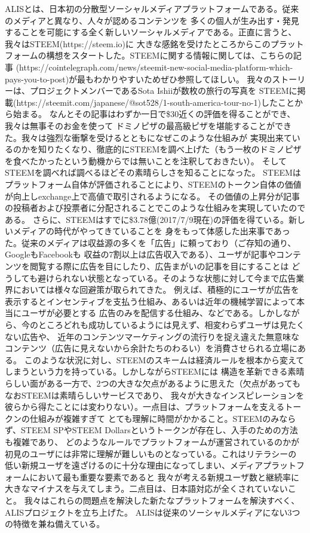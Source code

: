 \documentclass{jsarticle}
\begin{document}
ALISとは、日本初の分散型ソーシャルメディアプラットフォームである。従来のメディアと異なり、人々が認めるコンテンツを
多くの個人が生み出す・発見することを可能にする全く新しいソーシャルメディアである。正直に言うと、我々はSTEEM(https://steem.io)に
大きな感銘を受けたところからこのプラットフォームの構想をスタートした。STEEMに関する情報に関しては、こちらの記事
(https://cointelegraph.com/news/steemit-new-social-media-platform-which-pays-you-to-post)が最もわかりやすいためぜひ参照してほしい。
我々のストーリーは、プロジェクトメンバーであるSota Ishiiが数枚の旅行の写真を
STEEMに掲載(https://steemit.com/japanese/@sot528/1-south-america-tour-no-1)したことから始まる。
なんとその記事はわずか一日で\$30近くの評価を得ることができ、我々は無事そのお金を使って
ドミノピザの最高級ピザを堪能することができた。我々は強烈な衝撃を受けるとともになぜこのような仕組みが
実現出来ているのかを知りたくなり、徹底的にSTEEMを調べ上げた（もう一枚のドミノピザを食べたかったという動機からでは無いことを注釈しておきたい）。
そしてSTEEMを調べれば調べるほどその素晴らしさを知ることになった。
STEEMはプラットフォーム自体が評価されることにより、STEEMのトークン自体の価値が向上しexchange上で高値で取引されるようになる。
その価値の上昇分が記事の投稿者および投票者に分配されることでこのような仕組みを実現していたのである。
さらに、STEEMはすでに\$3.78億(2017/7/9現在)の評価を得ている。新しいメディアの時代がやってきていることを
身をもって体感した出来事であった。従来のメディアは収益源の多くを「広告」に頼っており（ご存知の通り、GoogleもFacebookも
収益の7割以上は広告収入である）、ユーザが記事やコンテンツを閲覧する際に広告を目にしたり、広告まがいの記事を目にすることは
どうしても避けられない状態となっている。そのような状態に対して今まで広告業界においては様々な回避策が取られてきた。
例えば、積極的にユーザが広告を表示するとインセンティブを支払う仕組み、あるいは近年の機械学習によって本当にユーザが必要とする
広告のみを配信する仕組み、などである。しかしながら、今のところどれも成功しているようには見えず、相変わらずユーザは見たくない広告や、
近年のコンテンツマーケティングの流行りを捉え違えた無意味なコンテンツ（広告に見えないから余計たちのわるい）を消費させられる立場にある。
このような状況に対し、STEEMのスキームは経済ルールを根本から変えてしまうという力を持っている。しかしながらSTEEMには
構造を革新できる素晴らしい面がある一方で、2つの大きな欠点があるように思えた（欠点があってもなおSTEEMは素晴らしいサービスであり、
我々が大きなインスピレーションを彼らから得たことには変わりない）。一点目は、プラットフォームを支えるトークンの仕組みが複雑すぎて
とても理解に時間がかかること。STEEMのみならず、STEEM SPやSTEEM Dollarsというトークンが存在し、入手のための方法も複雑であり、
どのようなルールでプラットフォームが運営されているのかが初見のユーザには非常に理解が難しいものとなっている。これはリテラシーの
低い新規ユーザを遠ざけるのに十分な理由になってしまい、メディアプラットフォームにおいて最も重要な要素であると
我々が考える新規ユーザ数と継続率に大きなマイナスを与えてしまう。二点目は、日本語対応が全くされていないこと。
我々はこれらの問題点を解決した新たなプラットフォームを解決すべく、ALISプロジェクトを立ち上げた。
ALISは従来のソーシャルメディアにない3つの特徴を兼ね備えている。
\end{document}
